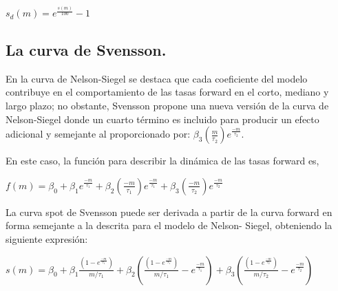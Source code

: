 \begin{center}
$\displaystyle{s_{d}(m) = e^{\frac{s(m)}{100}} - 1}$
\end{center}

\subsection{La curva de Svensson.\\}

\hspace*{0.4 cm} En la curva de Nelson-Siegel se destaca que cada coeficiente del modelo
contribuye en el comportamiento de las tasas forward en el corto,
mediano y largo plazo; no obstante, Svensson \cite{Sv} propone una nueva
versi\'on de la curva de Nelson-Siegel donde un cuarto t\'ermino es incluido
para producir un efecto adicional y semejante al proporcionado por:
$\beta_{3}(\frac{m}{\tau_{2}})e^{\frac{-m}{\tau_{2}}}$.

\hspace*{0.4 cm} En este caso, la funci\'on para describir la din\'amica de las tasas forward es,

\vspace*{0.2 cm}

\begin{center}
$\displaystyle{f(m) = \beta_{0} + \beta_{1} e^{\frac{-m}{\tau_{1}}} +\beta_{2} \left(\frac{-m}{\tau_{1}}\right)e^{\frac{-m}{\tau_{1}}} + \beta_{3}\left(\frac{-m}{\tau_{2}}\right)e^{\frac{-m}{\tau_{2}}} }$
\end{center}

\vspace*{0.2 cm}

\hspace*{0.4 cm} La curva spot de Svensson puede ser derivada a partir de la curva
forward en forma semejante a la descrita para el modelo de Nelson-
Siegel, obteniendo la siguiente expresi\'on:

\vspace*{0.2 cm}

\begin{center}
$\displaystyle{s(m) = \beta_{0}+ \beta_{1}\frac{\left(1-e^\frac{-m}{\tau_{1}}\right)}{m/\tau_{1}} + \beta_{2} \left(\frac{\left(1-e^\frac{-m}{\tau_{1}}\right)}{m/\tau_{1}} -  e^\frac{-m}{\tau_{1}}\right) + \beta_{3} \left(\frac{\left(1-e^\frac{-m}{\tau_{2}}\right)}{m/\tau_{2}} -  e^\frac{-m}{\tau_{2}}\right)}$
\end{center}

\vspace*{0.2 cm}

